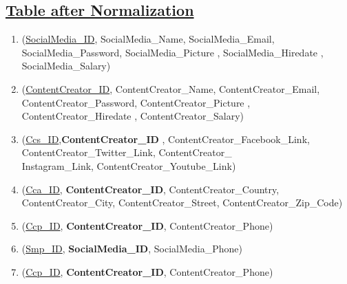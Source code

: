\subsection*{\underline{Table after Normalization}}
\begin{enumerate}
    \item  (\underline{SocialMedia\_ID}, SocialMedia\_Name, SocialMedia\_Email, SocialMedia\_Password, SocialMedia\_Picture , SocialMedia\_Hiredate , SocialMedia\_Salary)
    \item  (\underline{ContentCreator\_ID}, ContentCreator\_Name, ContentCreator\_Email, ContentCreator\_Password, ContentCreator\_Picture , ContentCreator\_Hiredate , ContentCreator\_Salary)
    \item (\underline{Ccs\_ID},\textbf{ContentCreator\_ID} , ContentCreator\_Facebook\_Link, ContentCreator\_Twitter\_Link, ContentCreator\_\\Instagram\_Link, ContentCreator\_Youtube\_Link)
    \item  (\underline{Cca\_ID}, \textbf{ContentCreator\_ID}, ContentCreator\_Country, ContentCreator\_City, ContentCreator\_Street, ContentCreator\_Zip\_Code)
    \item  (\underline{Ccp\_ID}, \textbf{ContentCreator\_ID}, ContentCreator\_Phone)
    \item  (\underline{Smp\_ID}, \textbf{SocialMedia\_ID}, SocialMedia\_Phone)
    \item  (\underline{Ccp\_ID}, \textbf{ContentCreator\_ID}, ContentCreator\_Phone)

\end{enumerate}

\clearpage